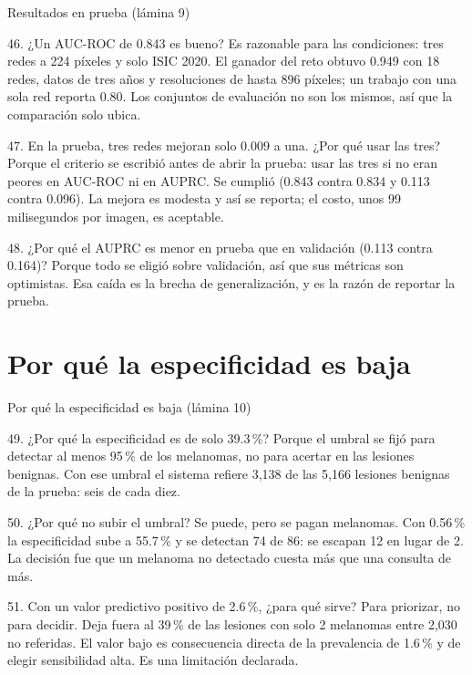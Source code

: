 \documentclass[aspectratio=169,10pt]{beamer}
\newcommand{\qa}[2]{\begin{block}{#1}\footnotesize #2\end{block}}
\begin{document}
\begin{frame}{Resultados en prueba (lámina 9)}
  \qa{46. ¿Un AUC-ROC de 0.843 es bueno?}{
    Es razonable para las condiciones: tres redes a 224 píxeles y solo ISIC 2020. El ganador del reto obtuvo 0.949 con 18 redes, datos de tres años y resoluciones de hasta 896 píxeles; un trabajo con una sola red reporta 0.80. Los conjuntos de evaluación no son los mismos, así que la comparación solo ubica.}
  \qa{47. En la prueba, tres redes mejoran solo 0.009 a una. ¿Por qué usar las tres?}{
    Porque el criterio se escribió antes de abrir la prueba: usar las tres si no eran peores en AUC-ROC ni en AUPRC. Se cumplió (0.843 contra 0.834 y 0.113 contra 0.096). La mejora es modesta y así se reporta; el costo, unos 99 milisegundos por imagen, es aceptable.}
  \qa{48. ¿Por qué el AUPRC es menor en prueba que en validación (0.113 contra 0.164)?}{
    Porque todo se eligió sobre validación, así que sus métricas son optimistas. Esa caída es la brecha de generalización, y es la razón de reportar la prueba.}
\end{frame}

\section{Por qué la especificidad es baja}
\begin{frame}{Por qué la especificidad es baja (lámina 10)}
  \qa{49. ¿Por qué la especificidad es de solo 39.3\,\%?}{
    Porque el umbral se fijó para detectar al menos 95\,\% de los melanomas, no para acertar en las lesiones benignas. Con ese umbral el sistema refiere 3,138 de las 5,166 lesiones benignas de la prueba: seis de cada diez.}
  \qa{50. ¿Por qué no subir el umbral?}{
    Se puede, pero se pagan melanomas. Con 0.56\,\% la especificidad sube a 55.7\,\% y se detectan 74 de 86: se escapan 12 en lugar de 2. La decisión fue que un melanoma no detectado cuesta más que una consulta de más.}
  \qa{51. Con un valor predictivo positivo de 2.6\,\%, ¿para qué sirve?}{
    Para priorizar, no para decidir. Deja fuera al 39\,\% de las lesiones con solo 2 melanomas entre 2,030 no referidas. El valor bajo es consecuencia directa de la prevalencia de 1.6\,\% y de elegir sensibilidad alta. Es una limitación declarada.}
\end{frame}

\end{document}
